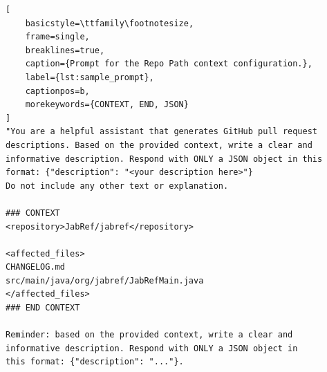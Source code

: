 \begin{lstlisting}[
    basicstyle=\ttfamily\footnotesize,
    frame=single,
    breaklines=true,
    caption={Prompt for the Repo Path context configuration.},
    label={lst:sample_prompt},
    captionpos=b,
    morekeywords={CONTEXT, END, JSON}
]
"You are a helpful assistant that generates GitHub pull request
descriptions. Based on the provided context, write a clear and
informative description. Respond with ONLY a JSON object in this
format: {"description": "<your description here>"}
Do not include any other text or explanation.

### CONTEXT
<repository>JabRef/jabref</repository>

<affected_files>
CHANGELOG.md
src/main/java/org/jabref/JabRefMain.java
</affected_files>
### END CONTEXT

Reminder: based on the provided context, write a clear and
informative description. Respond with ONLY a JSON object in
this format: {"description": "..."}.
\end{lstlisting}
